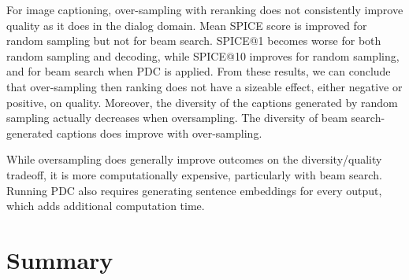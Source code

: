 \documentclass[thesis.tex]{subfiles}
\begin{document}
For image captioning, over-sampling with reranking does not consistently improve quality as it does in the dialog domain. Mean SPICE score is improved for random sampling but not for beam search.  SPICE@1 becomes worse for both random sampling and decoding, while SPICE@10 improves for random sampling, and for beam search when PDC is applied. From these results, we can conclude that over-sampling then ranking does not have a sizeable effect, either negative or positive, on quality. Moreover, the diversity of the captions generated by random sampling actually decreases when oversampling. The diversity of beam search-generated captions does improve with over-sampling.

While oversampling does generally improve outcomes on the diversity/quality tradeoff, it is more computationally expensive, particularly with beam search. Running PDC also requires generating sentence embeddings for every output, which adds additional computation time.

\section{Summary}


\biblio
\end{document}
